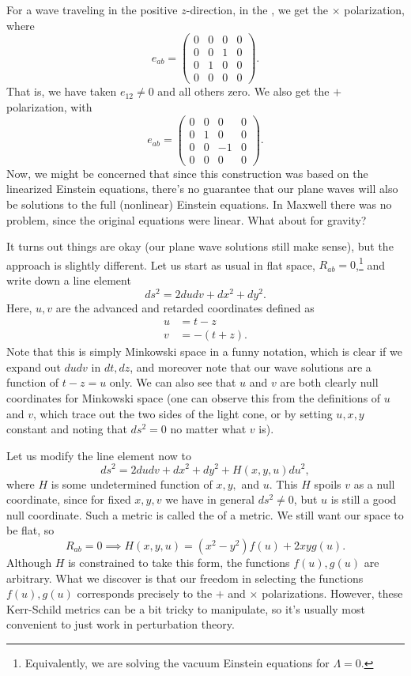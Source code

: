 For a wave traveling in the positive $z$-direction, in the , we get the $\times$ polarization, where
$$e_{ab}=\begin{pmatrix}
0&0&0&0\\
0&0&1&0\\
0&1&0&0\\
0&0&0&0
\end{pmatrix}.$$
That is, we have taken $e_{12}\neq 0$ and all others zero. We also get the $+$ polarization, with
$$e_{ab}=\begin{pmatrix}
0&0&0&0\\
0&1&0&0\\
0&0&-1&0\\
0&0&0&0
\end{pmatrix}.$$
Now, we might be concerned that since this construction was based on the linearized Einstein equations, there's no guarantee that our plane waves will also be solutions to the full (nonlinear) Einstein equations. In Maxwell there was no problem, since the original equations were linear. What about for gravity?

It turns out things are okay (our plane wave solutions still make sense), but the approach is slightly different. Let us start as usual in flat space, $R_{ab}=0$,\footnote{Equivalently, we are solving the vacuum Einstein equations for $\Lambda=0$.} and write down a line element
$$ds^2=2dudv + dx^2+dy^2.$$
Here, $u,v$ are the advanced and retarded coordinates defined as
\begin{align*}
    u&= t-z\\
    v&=-(t+z).
\end{align*}
Note that this is simply Minkowski space in a funny notation, which is clear if we expand out $dudv$ in $dt,dz$, and moreover note that our wave solutions are a function of $t-z=u$ only. We can also see that $u$ and $v$ are both clearly null coordinates for Minkowski space (one can observe this from the definitions of $u$ and $v$, which trace out the two sides of the light cone, or by setting $u,x,y$ constant and noting that $ds^2=0$ no matter what $v$ is). 

Let us modify the line element now to
$$ds^2=2dudv + dx^2+dy^2+H(x,y,u)du^2,$$
where $H$ is some undetermined function of $x,y,$ and $u$. This $H$ spoils $v$ as a null coordinate, since for fixed $x,y,v$ we have in general $ds^2\neq 0$, but $u$ is still a good null coordinate. Such a metric is called the  of a metric. We still want our space to be flat, so
$$R_{ab}=0 \implies H(x,y,u)=(x^2-y^2)f(u)+2xy g(u).$$
Although $H$ is constrained to take this form, the functions $f(u),g(u)$ are arbitrary. What we discover is that our freedom in selecting the functions $f(u),g(u)$ corresponds precisely to the $+$ and $\times$ polarizations. However, these Kerr-Schild metrics can be a bit tricky to manipulate, so it's usually most convenient to just work in perturbation theory.


